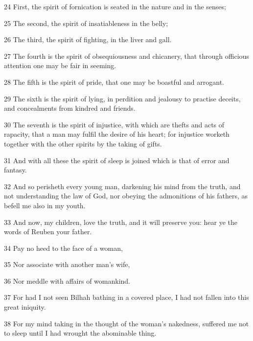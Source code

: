 \par 24 First, the spirit of fornication is seated in the nature and in the senses;

\par 25 The second, the spirit of insatiableness in the belly;

\par 26 The third, the spirit of fighting, in the liver and gall.

\par 27 The fourth is the spirit of obsequiousness and chicanery, that through officious attention one may be fair in seeming.

\par 28 The fifth is the spirit of pride, that one may be boastful and arrogant.

\par 29 The sixth is the spirit of lying, in perdition and jealousy to practise deceits, and concealments from kindred and friends.

\par 30 The seventh is the spirit of injustice, with which are thefts and acts of rapacity, that a man may fulfil the desire of his heart; for injustice worketh together with the other spirits by the taking of gifts.

\par 31 And with all these the spirit of sleep is joined which is that of error and fantasy.

\par 32 And so perisheth every young man, darkening his mind from the truth, and not understanding the law of God, nor obeying the admonitions of his fathers, as befell me also in my youth.

\par 33 And now, my children, love the truth, and it will preserve you: hear ye the words of Reuben your father.

\par 34 Pay no heed to the face of a woman,

\par 35 Nor associate with another man's wife,

\par 36 Nor meddle with affairs of womankind.

\par 37 For had I not seen Bilhah bathing in a covered place, I had not fallen into this great iniquity.

\par 38 For my mind taking in the thought of the woman's nakedness, suffered me not to sleep until I had wrought the abominable thing.


